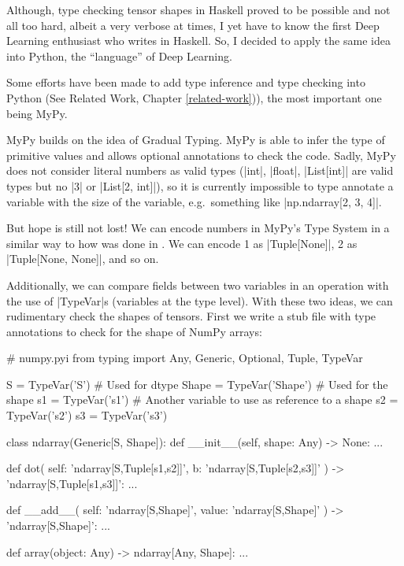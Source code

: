Although, type checking tensor shapes in Haskell proved to be possible
and not all too hard, albeit a very verbose at times, I yet have to know
the first Deep Learning enthusiast who writes in Haskell. So, I decided
to apply the same idea into Python, the \enquote{language} of Deep
Learning.

Some efforts have been made to add type inference and type checking into
Python (See Related Work, Chapter \ref{related-work})), the most
important one being MyPy.

{}

MyPy builds on the idea of Gradual Typing. MyPy is able to infer the
type of primitive values and allows optional annotations to check the
code. Sadly, MyPy does not consider literal numbers as valid types
(\pycode|int|, \pycode|float|, \pycode|List[int]| are valid types
but no \pycode|3| or \pycode|List[2, int]|), so it is currently
impossible to type annotate a variable with the size of the variable,
e.g.~something like \pycode|np.ndarray[2, 3, 4]|.

But hope is still not lost! We can encode numbers in MyPy's Type System
in a similar way to how was done in
\autocites{chen_typesafe_2017}{eaton_statically_2006}. We can encode 1
as \pycode|Tuple[None]|, 2 as \pycode|Tuple[None, None]|, and
so on.

Additionally, we can compare fields between two variables in an
operation with the use of \pycode|TypeVar|s (variables at the type
level). With these two ideas, we can rudimentary check the shapes of
tensors. First we write a stub file \autocite{pep484} with type
annotations to check for the shape of NumPy arrays:

\begin{pythoncode}
# numpy.pyi
from typing import Any, Generic, Optional, Tuple, TypeVar

S = TypeVar('S')  # Used for dtype
Shape = TypeVar('Shape')  # Used for the shape
s1 = TypeVar('s1')  # Another variable to use as reference to a shape
s2 = TypeVar('s2')
s3 = TypeVar('s3')


class ndarray(Generic[S, Shape]):
    def __init__(self, shape: Any) -> None: ...

    def dot(
            self: 'ndarray[S,Tuple[s1,s2]]',
            b: 'ndarray[S,Tuple[s2,s3]]'
    ) -> 'ndarray[S,Tuple[s1,s3]]': ...

    def __add__(
            self: 'ndarray[S,Shape]',
            value: 'ndarray[S,Shape]'
    ) -> 'ndarray[S,Shape]': ...


def array(object: Any) -> ndarray[Any, Shape]: ...
\end{pythoncode}

